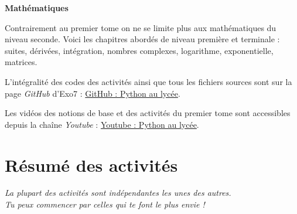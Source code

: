 \bigskip

{\large\textbf{Mathématiques}}

Contrairement au premier tome on ne se limite plus aux mathématiques du niveau seconde. Voici les chapitres abordés de niveau première et terminale : suites, dérivées, intégration, nombres complexes, logarithme, exponentielle, matrices. 




\bigskip
\vspace*{\fill}
\begin{center}
L'intégralité des codes \Python{} des activités ainsi que tous les fichiers sources sont sur la page \emph{GitHub} d'Exo7 :
\href{https://github.com/exo7math/python2-exo7}{\og{}GitHub : Python au lycée\fg{}}.

\medskip

Les vidéos des notions de base et des activités du premier tome sont accessibles depuis la chaîne \emph{Youtube} :
\href{https://www.youtube.com/channel/UC6PiFyqBiUjiJ7Q3DRSW2Wg}{\og{}Youtube : Python au lycée\fg{}}.
\end{center}





\cleardoublepage
\thispagestyle{empty}
\tableofcontents


\newpage

\section*{Résumé des activités}


\newcommand{\titreactivite}[1]{{\textbf{#1}}\nopagebreak}
\newcommand{\descriptionactivite}[1]{%
\smallskip\hfill
\begin{minipage}{0.95\textwidth}\small#1\end{minipage}\medskip\smallskip}


\begin{center}
\begin{minipage}{0.8\textwidth}
\center\emph{
La plupart des activités sont indépendantes les unes des autres.\\
Tu peux commencer par celles qui te font le plus envie !
}	
\end{minipage}
\end{center}

\bigskip

